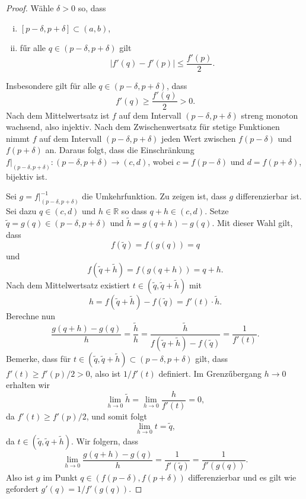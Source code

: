 \documentclass[../main.tex]{subfiles}
\begin{document}
\begin{proof}
  Wähle $\delta > 0$ so, dass
  \begin{enumerate}[(i)]
    \item $[p - \delta, p + \delta] \subset (a,b)$,
    \item fűr alle $q \in (p - \delta, p + \delta)$ gilt
      \[
        |f'(q) - f'(p)| \leq \frac{f'(p)}{2}.
      \]
  \end{enumerate}
  Insbesondere gilt für alle $q \in (p - \delta, p + \delta)$, dass
  \[
    f'(q) \geq \frac{f'(q)}{2} > 0.
  \]
  Nach dem Mittelwertsatz ist $f$ auf dem
  Intervall $(p -\delta, p+\delta)$ streng
  monoton wachsend, also injektiv.
  Nach dem Zwischenwertsatz für stetige Funktionen
  nimmt $f$ auf dem Intervall $(p - \delta, p + \delta)$ 
  jeden Wert zwischen $f(p - \delta)$ und $f(p + \delta)$ an.
  Daraus folgt, dass die Einschränkung
  $f|_{(p - \delta, p + \delta)} \colon (p - \delta, p + \delta) \to (c, d)$,
  wobei
  $c = f(p - \delta)$ und $d = f(p + \delta)$,
  bijektiv ist.

  Sei $g = f|_{(p - \delta, p + \delta)}^{-1}$ die
  Umkehrfunktion.
  Zu zeigen ist, dass $g$ differenzierbar ist.
  Sei dazu $q \in (c, d)$ und $h \in \mathbb{R}$ so dass
  $q + h \in (c, d)$. 
  Setze $\tilde q = g(q) \in (p - \delta, p +\delta)$ und
  $\tilde h = g(q + h) - g(q)$.
  Mit dieser Wahl gilt, dass
  \[
    f(\tilde q) = f(g(q)) = q
  \]
  und
  \[
    f(\tilde q + \tilde h) = f(g(q + h)) = q + h.
  \]
  Nach dem Mittelwertsatz existiert $t \in (\tilde q, \tilde q + \tilde h)$ 
  mit
  \[
    h = f(\tilde q + \tilde h) - f(\tilde q) = f'(t) \cdot \tilde h.
  \]
  Berechne nun
  \[
    \frac{g(q + h) - g(q)}{h} = \frac{\tilde h}{h} =
    \frac{\tilde h}{f(\tilde q + \tilde h) - f(\tilde q) } =
    \frac{1}{f'(t)}.
  \]
  Bemerke, dass für $t \in (\tilde q, \tilde q + \tilde h) \subset (p - \delta, p + \delta)$ 
  gilt, dass
  $f'(t) \geq f'(p) / 2 > 0$, also ist $1/f'(t)$ definiert.
  Im Grenzűbergang $h \to 0$ erhalten wir
  \[
    \lim_{h \to 0} \tilde h = \lim_{h \to 0} \frac{h}{f'(t)} = 0,
  \]
  da $f'(t) \geq f'(p) / 2$, und somit folgt
  \[
    \lim_{h \to 0} t = \tilde q,
  \]
  da $t \in (\tilde q, \tilde q + \tilde h)$. Wir folgern,
  dass
  \[
    \lim_{h \to 0} \frac{g(q + h) - g(q)}{h} = \frac{1}{f'(\tilde q)} = \frac{1}{f'(g(q))}.
  \]
  Also ist $g$ im Punkt $q \in (f(p - \delta), f(p + \delta))$ differenzierbar
  und es gilt wie gefordert $g'(q) = 1 / f'(g(q))$.
\end{proof}
\end{document}
